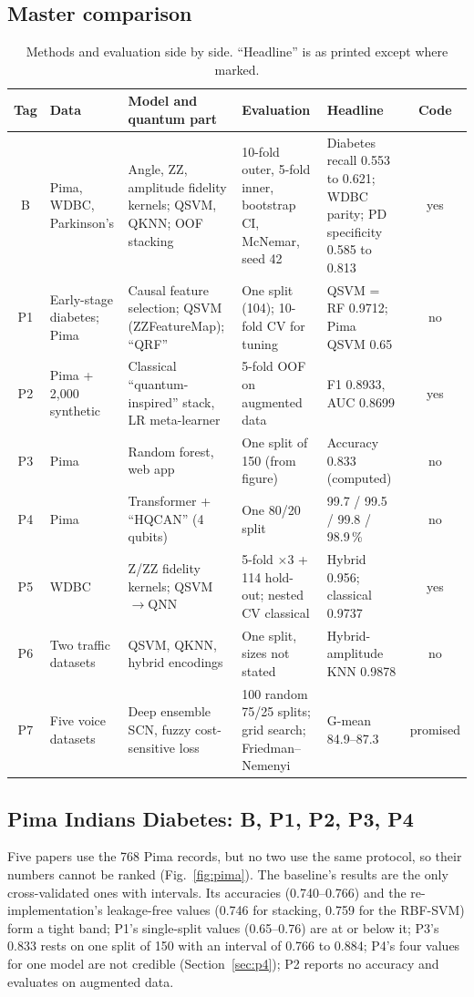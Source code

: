 \documentclass[11pt,a4paper]{article}
\begin{document}
\subsection{Master comparison}
\begin{table}[H]
\centering\scriptsize
\caption{Methods and evaluation side by side. ``Headline'' is as printed except where marked.}
\label{tab:master}
\begin{tabularx}{\textwidth}{c L{2.4cm} L{3.4cm} L{3.4cm} Y c}
\toprule
Tag & Data & Model and quantum part & Evaluation & Headline & Code \\
\midrule
B & Pima, WDBC, Parkinson's & Angle, ZZ, amplitude fidelity kernels; QSVM, QKNN; OOF stacking & 10-fold outer, 5-fold inner, bootstrap CI, McNemar, seed 42 & Diabetes recall 0.553 to 0.621; WDBC parity; PD specificity 0.585 to 0.813 & yes \\
P1 & Early-stage diabetes; Pima & Causal feature selection; QSVM (ZZFeatureMap); ``QRF'' & One split (104); 10-fold CV for tuning & QSVM = RF 0.9712; Pima QSVM 0.65 & no \\
P2 & Pima + 2,000 synthetic & Classical ``quantum-inspired'' stack, LR meta-learner & 5-fold OOF on augmented data & F1 0.8933, AUC 0.8699 & yes \\
P3 & Pima & Random forest, web app & One split of 150 (from figure) & Accuracy 0.833 (computed) & no \\
P4 & Pima & Transformer + ``HQCAN'' (4 qubits) & One 80/20 split & 99.7 / 99.5 / 99.8 / 98.9\,\% & no \\
P5 & WDBC & Z/ZZ fidelity kernels; QSVM$\to$QNN & 5-fold $\times$3 + 114 hold-out; nested CV classical & Hybrid 0.956; classical 0.9737 & yes \\
P6 & Two traffic datasets & QSVM, QKNN, hybrid encodings & One split, sizes not stated & Hybrid-amplitude KNN 0.9878 & no \\
P7 & Five voice datasets & Deep ensemble SCN, fuzzy cost-sensitive loss & 100 random 75/25 splits; grid search; Friedman--Nemenyi & G-mean 84.9--87.3 & promised \\
\bottomrule
\end{tabularx}
\end{table}

\subsection{Pima Indians Diabetes: B, P1, P2, P3, P4}
\label{sec:pima}
Five papers use the 768 Pima records, but no two use the same protocol, so their numbers cannot be ranked (Fig.~\ref{fig:pima}). The baseline's results are the only cross-validated ones with intervals. Its accuracies (0.740--0.766) and the re-implementation's leakage-free values (0.746 for stacking, 0.759 for the RBF-SVM) form a tight band; P1's single-split values (0.65--0.76) are at or below it; P3's 0.833 rests on one split of 150 with an interval of 0.766 to 0.884; P4's four values for one model are not credible (Section~\ref{sec:p4}); P2 reports no accuracy and evaluates on augmented data.
\end{document}

